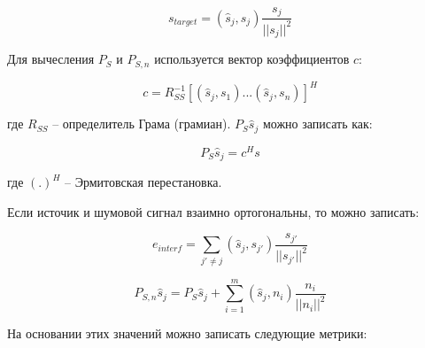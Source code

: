 \begin{equation}
s_{target} = (\hat{s}_j, s_j) \frac{s_j}{|| s_j ||^2}
\end{equation}

Для вычесления $P_S$ и $P_{S,n}$ используется вектор коэффициентов $c$:

\begin{equation}
c = R_{SS}^{-1}[ (\hat{s}_j, s_1) ... (\hat{s}_j, s_n) ]^H
\end{equation}

где $R_{SS}$ -- определитель Грама (грамиан). $P_S \hat{s}_j$ можно записать как:

\begin{equation}
P_S \hat{s}_j = c^H s
\end{equation}

где $(.)^H$ -- Эрмитовская перестановка. 

Если источик и шумовой сигнал взаимно ортогональны, то можно записать:

\begin{equation}
	e_{interf} = \sum_{j' \ne j} (\hat{s}_j, s_{j'}) \frac{s_{j'}}{|| s_{j'} ||^2}
\end{equation}

\begin{equation}
P_{S,n}\hat{s}_j = P_S \hat{s}_j + \sum_{i=1}^{m}(\hat{s}_j, n_i) \frac{n_i}{|| n_i ||^2}
\end{equation}

На основании этих значений можно записать следующие метрики:

